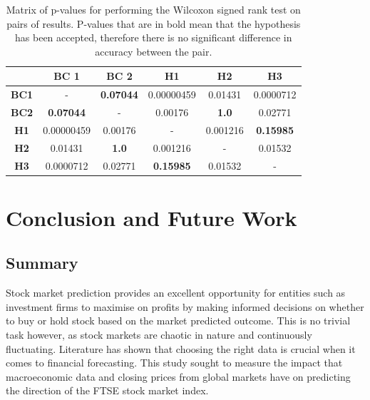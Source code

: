 \documentclass{UoYCSproject}
\begin{document}
\begin{table}[h]
    \centering
    \begin{tabular}{|c|c|c|c|c|c|} \hline
         &  \textbf{BC 1} & \textbf{BC 2} & \textbf{H1} & \textbf{H2} & \textbf{H3} \\ \hline
        \textbf{BC1} & - & \textbf{0.07044} & 0.00000459 &  0.01431 & 0.0000712\\
        \textbf{BC2} & \textbf{0.07044} & - & 0.00176 & \textbf{1.0} & 0.02771 \\
        \textbf{H1} & 0.00000459 & 0.00176 & - & 0.001216 & \textbf{0.15985} \\
        \textbf{H2} & 0.01431 & \textbf{1.0} & 0.001216 & - & 0.01532\\
        \textbf{H3} & 0.0000712 & 0.02771 & \textbf{0.15985} & 0.01532 & -  \\
        \hline
    \end{tabular}
    \caption{Matrix of p-values for performing the Wilcoxon signed rank test on pairs of results. P-values that are in bold mean that the hypothesis has been accepted, therefore there is no significant difference in accuracy between the pair. }
    \label{tab:wilcoxon_results}
\end{table}


\chapter{Conclusion and Future Work}
\label{cha:conclusions}

\section{Summary}
Stock market prediction provides an excellent opportunity for entities such as investment firms to maximise on profits by making informed decisions on whether to buy or hold stock based on the market predicted outcome. This is no trivial task however, as stock markets are chaotic in nature and continuously fluctuating. Literature has shown that choosing the right data is crucial when it comes to financial forecasting. This study sought to measure the impact that macroeconomic data and closing prices from global markets have on predicting the direction of the FTSE stock market index. 
\end{document}
